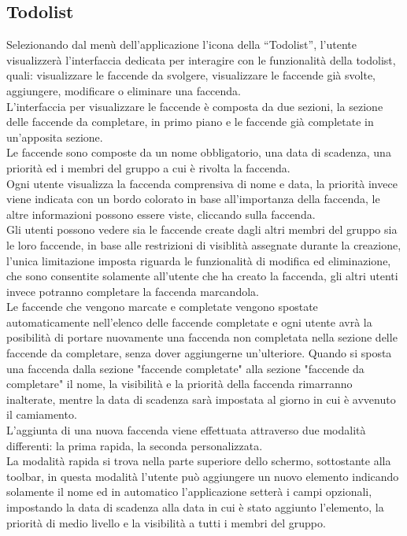 \subsection{Todolist}
Selezionando dal menù dell'applicazione l'icona della ``Todolist'', l'utente visualizzerà l'interfaccia dedicata per interagire con le funzionalità della todolist, quali: visualizzare le faccende da svolgere, visualizzare le faccende già svolte, aggiungere, modificare o eliminare una faccenda.\\
L'interfaccia per visualizzare le faccende è composta da due sezioni, la sezione delle faccende da completare, in primo piano e le faccende già completate in un'apposita sezione.\\
Le faccende sono composte da un nome obbligatorio, una data di scadenza, una priorità ed i membri del gruppo a cui è rivolta la faccenda.\\
Ogni utente visualizza la faccenda comprensiva di nome e data, la priorità invece viene indicata con un bordo colorato in base all'importanza della faccenda, le altre informazioni possono essere viste, cliccando sulla faccenda.\\
Gli utenti possono vedere sia le faccende create dagli altri membri del gruppo sia le loro faccende, in base alle restrizioni di visiblità assegnate durante la creazione, l'unica limitazione imposta riguarda le funzionalità di modifica ed eliminazione, che sono consentite solamente all'utente che ha creato la faccenda, gli altri utenti invece potranno completare la faccenda marcandola.\\
Le faccende che vengono marcate e completate vengono spostate automaticamente nell'elenco delle faccende completate e ogni utente avrà la posibilità di portare nuovamente una faccenda non completata nella sezione delle faccende da completare, senza dover aggiungerne un'ulteriore. Quando si sposta una faccenda dalla sezione "faccende completate" alla sezione "faccende da completare" il nome, la visibilità e la priorità della faccenda rimarranno inalterate, mentre la data di scadenza sarà impostata al giorno in cui è avvenuto il camiamento.\\
L'aggiunta di una nuova faccenda viene effettuata attraverso due modalità differenti: la prima rapida, la seconda personalizzata.\\
La modalità rapida si trova nella parte superiore dello schermo, sottostante alla toolbar, in questa modalità l'utente può aggiungere un nuovo elemento indicando solamente il nome ed in automatico l'applicazione setterà i campi opzionali, impostando la data di scadenza alla data in cui è stato aggiunto l'elemento, la priorità di medio livello e la visibilità a tutti i membri del gruppo.\\

